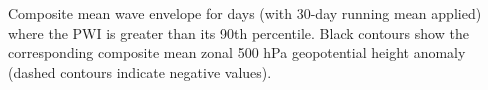 \label{fig:envelope_climatology}
Composite mean wave envelope for days (with 30-day running mean applied) where the PWI is greater than its 90th percentile. Black contours show the corresponding composite mean zonal 500 hPa geopotential height anomaly (dashed contours indicate negative values).  